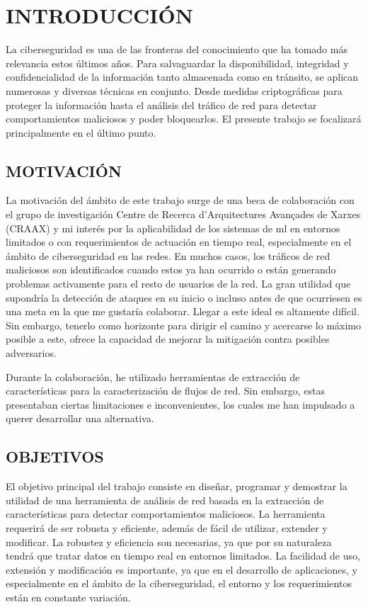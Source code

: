 \newpage
\pagestyle{plain}

\chapter{INTRODUCCIÓN}

La ciberseguridad es una de las fronteras del conocimiento que ha tomado más relevancia estos últimos años. Para salvaguardar la disponibilidad, integridad y confidencialidad de la información tanto almacenada como en tránsito, se aplican numerosas y diversas técnicas en conjunto. Desde medidas criptográficas para proteger la información hasta el análisis del tráfico de red para detectar comportamientos maliciosos y poder bloquearlos. El presente trabajo se focalizará principalmente en el último punto.

\section{MOTIVACIÓN}

La motivación del ámbito de este trabajo surge de una beca de colaboración con el grupo de investigación Centre de Recerca d'Arquitectures Avançades de Xarxes (CRAAX) y mi interés por la aplicabilidad de los sistemas de \gls{ml} en entornos limitados o con requerimientos de actuación en tiempo real, especialmente en el ámbito de ciberseguridad en las redes. En muchos casos, los tráficos de red maliciosos son identificados cuando estos ya han ocurrido o están generando problemas activamente para el resto de usuarios de la red. La gran utilidad que supondría la detección de ataques en su inicio o incluso antes de que ocurriesen es una meta en la que me gustaría colaborar. Llegar a este ideal es altamente difícil. Sin embargo, tenerlo como horizonte para dirigir el camino y acercarse lo máximo posible a este, ofrece la capacidad de mejorar la mitigación contra posibles adversarios.

Durante la colaboración, he utilizado herramientas de extracción de características para la caracterización de flujos de red. Sin embargo, estas presentaban ciertas limitaciones e inconvenientes, los cuales me han impulsado a querer desarrollar una alternativa.

\section{OBJETIVOS}

El objetivo principal del trabajo consiste en diseñar, programar y demostrar la utilidad de una herramienta de análisis de red basada en la extracción de características para detectar comportamientos maliciosos. La herramienta requerirá de ser robusta y eficiente, además de fácil de utilizar, extender y modificar. La robustez y eficiencia son necesarias, ya que por su naturaleza tendrá que tratar datos en tiempo real en entornos limitados. La facilidad de uso, extensión y modificación es importante, ya que en el desarrollo de aplicaciones, y especialmente en el ámbito de la ciberseguridad, el entorno y los requerimientos están en constante variación.

